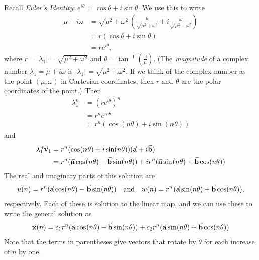 Recall \emph{Euler's Identity}:
 $e^{i\theta} = \cos \theta + i \sin\theta$.
We use this to write
\begin{equation}
\begin{split}
  \mu + i \omega & = \sqrt{\mu^2+\omega^2}\,
                      \left(\frac{\mu}{\sqrt{\mu^2+\omega^2}} +
		            i \frac{\omega}{\sqrt{\mu^2+\omega^2}}\right) \\
	         & = r (\cos\theta + i \sin\theta) \\
		 & = r e^{i\theta}, 
\end{split}
\end{equation}
where $r = |\lambda_1| = \sqrt{\mu^2+\omega^2}$
and $\theta = \tan^{-1}\left(\frac{\omega}{\mu}\right)$.
(The \emph{magnitude} of a complex number
$\lambda_1=\mu+i\omega$ is $|\lambda_1|=\sqrt{\mu^2+\omega^2}$.
If we think of the complex number as the point $(\mu,\omega)$
in Cartesian coordinates, then $r$ and $\theta$ are the
polar coordinates of the point.)
Then
\begin{equation}
\begin{split}
  \lambda_1^n & = (re^{i\theta})^n  \\
              & = r^n e^{in\theta}  \\
	      & = r^n(\cos(n\theta) + i \sin(n\theta))
\end{split}
\end{equation}
and
\begin{equation}
\begin{split}
   \lambda_1^n\vec{\textbf{v}}_1 & = r^n(\cos(n\theta) + i \sin(n\theta))(\vec{\textbf{a}}+i\vec{\textbf{b}}) \\
     & = r^n(\vec{\textbf{a}}\cos(n\theta)-\vec{\textbf{b}}\sin(n\theta)) +
          i r^n(\vec{\textbf{a}}\sin(n\theta)+\vec{\textbf{b}}\cos(n\theta))
\end{split}
\end{equation}
The real and imaginary parts of this solution are
\begin{equation}
  u(n) = r^n(\vec{\textbf{a}}\cos(n\theta)-\vec{\textbf{b}}\sin(n\theta))
  \quad \textrm{and} \quad
  w(n) = r^n(\vec{\textbf{a}}\sin(n\theta)+\vec{\textbf{b}}\cos(n\theta)),
\end{equation}
respectively.
Each of these is solution to the linear map, and
we can use these to write the general solution as
\begin{equation}
  \vec{\textbf{x}}(n) =    c_1 r^n(\vec{\textbf{a}}\cos(n\theta)-\vec{\textbf{b}}\sin(n\theta))
           + c_2 r^n(\vec{\textbf{a}}\sin(n\theta)+\vec{\textbf{b}}\cos(n\theta))
\end{equation}
Note that the terms in parentheses give vectors that
rotate by $\theta$ for each increase of $n$ by one.
